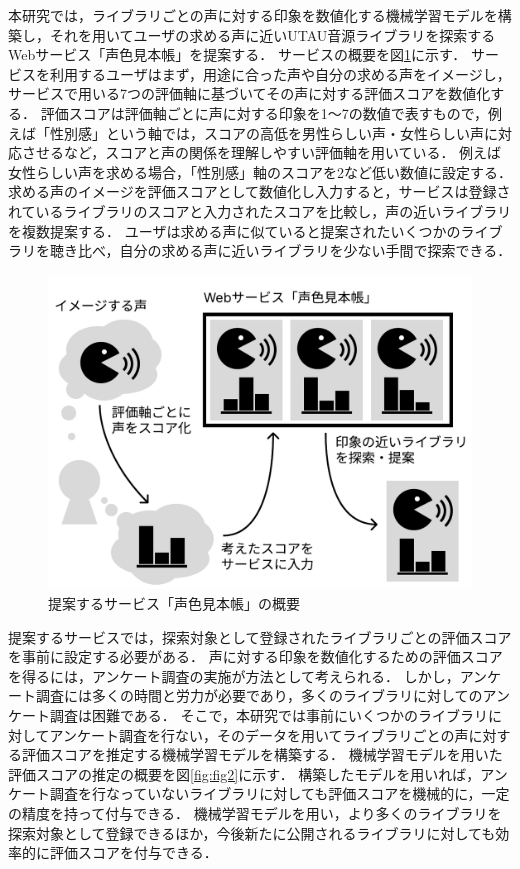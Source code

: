 本研究では，ライブラリごとの声に対する印象を数値化する機械学習モデルを構築し，それを用いてユーザの求める声に近いUTAU音源ライブラリを探索するWebサービス「声色見本帳」を提案する．
サービスの概要を図\ref{fig:fig1}に示す．
サービスを利用するユーザはまず，用途に合った声や自分の求める声をイメージし，サービスで用いる7つの評価軸に基づいてその声に対する評価スコアを数値化する．
評価スコアは評価軸ごとに声に対する印象を1〜7の数値で表すもので，例えば「性別感」という軸では，スコアの高低を男性らしい声・女性らしい声に対応させるなど，スコアと声の関係を理解しやすい評価軸を用いている．
例えば女性らしい声を求める場合，「性別感」軸のスコアを2など低い数値に設定する．
求める声のイメージを評価スコアとして数値化し入力すると，サービスは登録されているライブラリのスコアと入力されたスコアを比較し，声の近いライブラリを複数提案する．
ユーザは求める声に似ていると提案されたいくつかのライブラリを聴き比べ，自分の求める声に近いライブラリを少ない手間で探索できる．

\begin{figure}[htb]
  \centering
  \includegraphics[width=0.9\linewidth]{fig/fig1.pdf}
  \caption{提案するサービス「声色見本帳」の概要}
  \label{fig:fig1}
\end{figure}

提案するサービスでは，探索対象として登録されたライブラリごとの評価スコアを事前に設定する必要がある．
声に対する印象を数値化するための評価スコアを得るには，アンケート調査の実施が方法として考えられる．
しかし，アンケート調査には多くの時間と労力が必要であり，多くのライブラリに対してのアンケート調査は困難である．
そこで，本研究では事前にいくつかのライブラリに対してアンケート調査を行ない，そのデータを用いてライブラリごとの声に対する評価スコアを推定する機械学習モデルを構築する．
機械学習モデルを用いた評価スコアの推定の概要を図\ref{fig:fig2}に示す．
構築したモデルを用いれば，アンケート調査を行なっていないライブラリに対しても評価スコアを機械的に，一定の精度を持って付与できる．
機械学習モデルを用い，より多くのライブラリを探索対象として登録できるほか，今後新たに公開されるライブラリに対しても効率的に評価スコアを付与できる．

